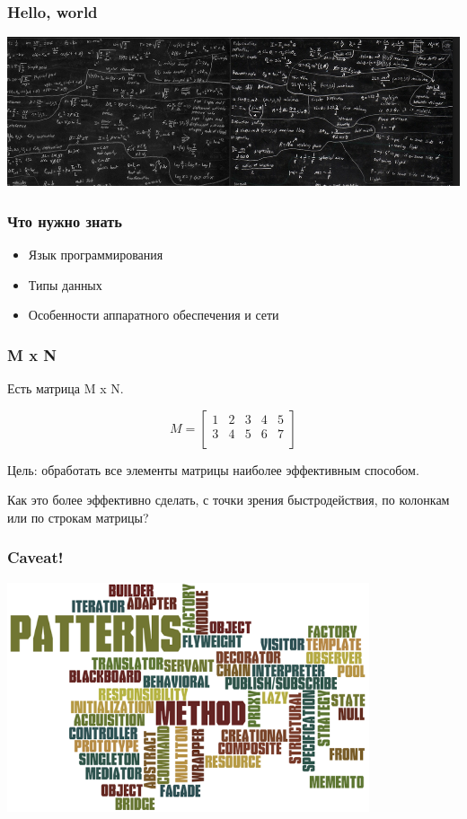 \documentclass[10pt,pdf,hyperref={unicode}]{beamer}
\begin{document}
\begin{frame}
\frametitle{ Hello, world }
	\center
		\includegraphics[width=1.0\textwidth]{./haskell.png}		
\end{frame}

\begin{frame}
\frametitle{ Что нужно знать}

\begin{itemize}

	\item Язык программирования
	\item Типы данных
	\item  Особенности аппаратного обеспечения и сети

\end{itemize}

\end{frame}

\begin{frame}
\frametitle{ M x N }

\par
Есть матрица M x N. 

\par
\[
  M=
  \left[ {\begin{array}{ccccc}
   1 & 2 & 3 & 4 & 5\\
   3 & 4 & 5 & 6 & 7\\
  \end{array} } \right]
\]

\par
Цель: обработать все элементы матрицы наиболее эффективным способом.

\par
Как это более эффективно сделать, с точки зрения быстродействия, по колонкам или по строкам матрицы?

\end{frame}

\begin{frame}
\frametitle{ Caveat! }
	\center
		\includegraphics[width=0.8\textwidth]{./antipattern.png}
\end {frame}
\end{document}
